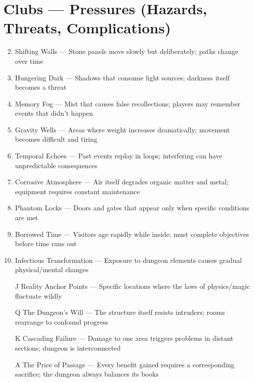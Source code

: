 \section*{Clubs --- Pressures (Hazards, Threats, Complications)}
\label{sec:dungeon-pressures}
\begin{enumerate}
\setcounter{enumi}{1}
\item Shifting Walls --- Stone panels move slowly but deliberately; paths change over time
\item Hungering Dark --- Shadows that consume light sources; darkness itself becomes a threat
\item Memory Fog --- Mist that causes false recollections; players may remember events that didn't happen
\item Gravity Wells --- Areas where weight increases dramatically; movement becomes difficult and tiring
\item Temporal Echoes --- Past events replay in loops; interfering can have unpredictable consequences
\item Corrosive Atmosphere --- Air itself degrades organic matter and metal; equipment requires constant maintenance
\item Phantom Locks --- Doors and gates that appear only when specific conditions are met
\item Borrowed Time --- Visitors age rapidly while inside; must complete objectives before time runs out
\item Infectious Transformation --- Exposure to dungeon elements causes gradual physical/mental changes
\item[J] Reality Anchor Points --- Specific locations where the laws of physics/magic fluctuate wildly
\item[Q] The Dungeon's Will --- The structure itself resists intruders; rooms rearrange to confound progress
\item[K] Cascading Failure --- Damage to one area triggers problems in distant sections; dungeon is interconnected
\item[A] The Price of Passage --- Every benefit gained requires a corresponding sacrifice; the dungeon always balances its books
\end{enumerate}

